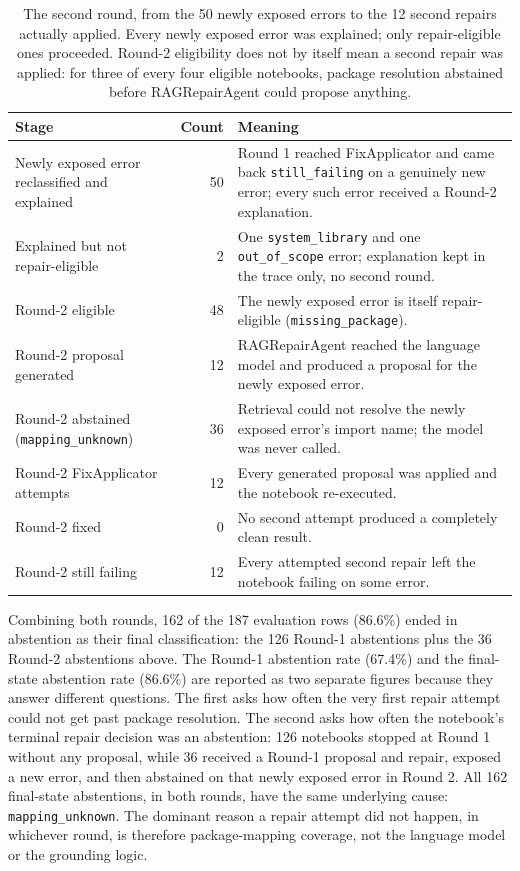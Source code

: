 \begin{table}[htbp]
  \centering
  \begin{tabular}{|p{4.0cm}|r|p{6.5cm}|}
    \hline
    \textbf{Stage} & \textbf{Count} & \textbf{Meaning} \\
    \hline
    Newly exposed error reclassified and explained & 50 & Round 1 reached FixApplicator and came back \texttt{still\_failing} on a genuinely new error; every such error received a Round-2 explanation. \\
    \hline
    Explained but not repair-eligible & 2 & One \texttt{system\_library} and one \texttt{out\_of\_scope} error; explanation kept in the trace only, no second round. \\
    \hline
    Round-2 eligible & 48 & The newly exposed error is itself repair-eligible (\texttt{missing\_package}). \\
    \hline
    Round-2 proposal generated & 12 & RAGRepairAgent reached the language model and produced a proposal for the newly exposed error. \\
    \hline
    Round-2 abstained (\texttt{mapping\_unknown}) & 36 & Retrieval could not resolve the newly exposed error's import name; the model was never called. \\
    \hline
    Round-2 FixApplicator attempts & 12 & Every generated proposal was applied and the notebook re-executed. \\
    \hline
    Round-2 fixed & 0 & No second attempt produced a completely clean result. \\
    \hline
    Round-2 still failing & 12 & Every attempted second repair left the notebook failing on some error. \\
    \hline
  \end{tabular}
  \caption{The second round, from the 50 newly exposed errors to the 12
  second repairs actually applied. Every newly exposed error was explained;
  only repair-eligible ones proceeded. Round-2 eligibility does not by
  itself mean a second repair was applied: for three of every four eligible
  notebooks, package resolution abstained before RAGRepairAgent could
  propose anything.}
  \label{tab:v-final-round2}
\end{table}

Combining both rounds, 162 of the 187 evaluation rows (86.6\%) ended in
abstention as their final classification: the 126 Round-1 abstentions
plus the 36 Round-2 abstentions above. The Round-1 abstention rate
(67.4\%) and the final-state abstention rate (86.6\%) are reported as two
separate figures because they answer different questions. The first asks
how often the very first repair attempt could not get past package
resolution. The second asks how often the notebook's terminal repair
decision was an abstention: 126 notebooks stopped at Round 1 without any
proposal, while 36 received a Round-1 proposal and repair, exposed a new
error, and then abstained on that newly exposed error in Round 2. All 162
final-state abstentions, in both rounds, have the same underlying cause:
\texttt{mapping\_unknown}. The dominant reason a repair attempt did not
happen, in whichever round, is therefore package-mapping coverage, not
the language model or the grounding logic.

